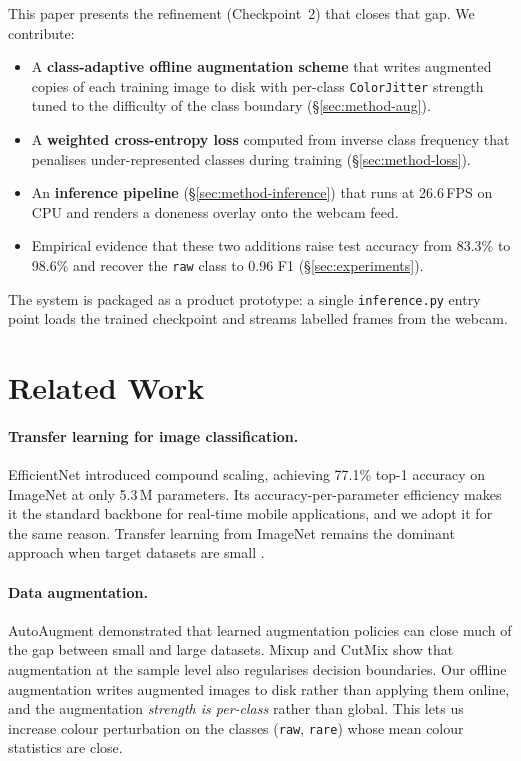 \documentclass{article}
\begin{document}
This paper presents the refinement (Checkpoint~2) that closes that gap. We
contribute:

\begin{itemize}
    \item A \textbf{class-adaptive offline augmentation scheme} that writes
    augmented copies of each training image to disk with per-class
    \texttt{ColorJitter} strength tuned to the difficulty of the class
    boundary (\S\ref{sec:method-aug}).
    \item A \textbf{weighted cross-entropy loss} computed from inverse class
    frequency that penalises under-represented classes during training
    (\S\ref{sec:method-loss}).
    \item An \textbf{inference pipeline}
    (\S\ref{sec:method-inference}) that runs at 26.6\,FPS on CPU and renders a
    doneness overlay onto the webcam feed.
    \item Empirical evidence that these two additions raise test accuracy from
    83.3\% to 98.6\% and recover the \texttt{raw} class to 0.96 F1
    (\S\ref{sec:experiments}).
\end{itemize}

The system is packaged as a product prototype: a single
\texttt{inference.py} entry point loads the trained checkpoint and streams
labelled frames from the webcam.

\section{Related Work}
\label{sec:related}

\paragraph{Transfer learning for image classification.} EfficientNet
\citep{tan2019efficientnet} introduced compound scaling, achieving 77.1\% top-1
accuracy on ImageNet \citep{russakovsky2015imagenet} at only 5.3\,M parameters.
Its accuracy-per-parameter efficiency makes it the standard backbone for
real-time mobile applications, and we adopt it for the same reason.
Transfer learning from ImageNet remains the dominant approach when target
datasets are small \citep{kornblith2019do}.

\paragraph{Data augmentation.} AutoAugment \citep{cubuk2019autoaugment}
demonstrated that learned augmentation policies can close much of the gap
between small and large datasets. Mixup \citep{zhang2018mixup} and CutMix
\citep{yun2019cutmix} show that augmentation at the sample level also
regularises decision boundaries. Our offline augmentation writes augmented
images to disk rather than applying them online, and the augmentation
\emph{strength is per-class} rather than global. This lets us increase
colour perturbation on the classes (\texttt{raw}, \texttt{rare}) whose mean
colour statistics are close.
\end{document}
